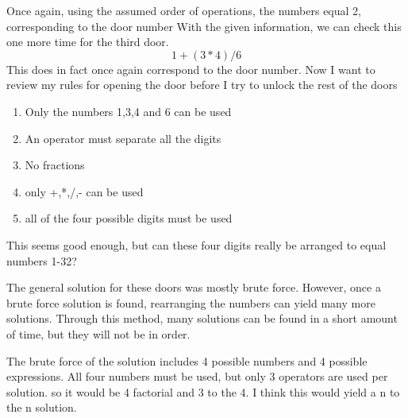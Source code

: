 \documentclass[12pt]{article}
\begin{document}
\vspace{5mm}
\noindent Once again, using the assumed order of operations, the numbers equal 2, corresponding to the door number
\vspace{5mm}
\noindent With the given information, we can check this one more time for the third door.
\vspace{5mm}
\[1+(3*4)/6\]
\vspace{5mm}
\noindent This does in fact once again correspond to the door number.
\vspace{5mm}
\noindent Now I want to review my rules for opening the door before I try to unlock the rest of the doors
\vspace{5mm}
\begin{enumerate}
    \item Only the numbers 1,3,4 and 6 can be used
    \item An operator must separate all the digits
    \item No fractions
    \item only +,*,/,- can be used
    \item all of the four possible digits must be used
\end{enumerate}
\vspace{5mm}
\noindent This seems good enough, but can these four digits really be arranged to equal numbers 1-32?
\vspace{5mm}



\vspace{5mm}
\noindent The general solution for these doors was mostly brute force.
However, once a brute force solution is found, rearranging the numbers can yield many more solutions.
Through this method, many solutions can be found in a short amount of time, but they will not be in order.

\vspace{5mm}
\noindent 
The brute force of the solution includes 4 possible numbers and 4 possible expressions.
All four numbers must be used, but only 3 operators are used per solution. so it would be 4 factorial and 3 to the 4.
I think this would yield a n to the n solution.
\end{document}
